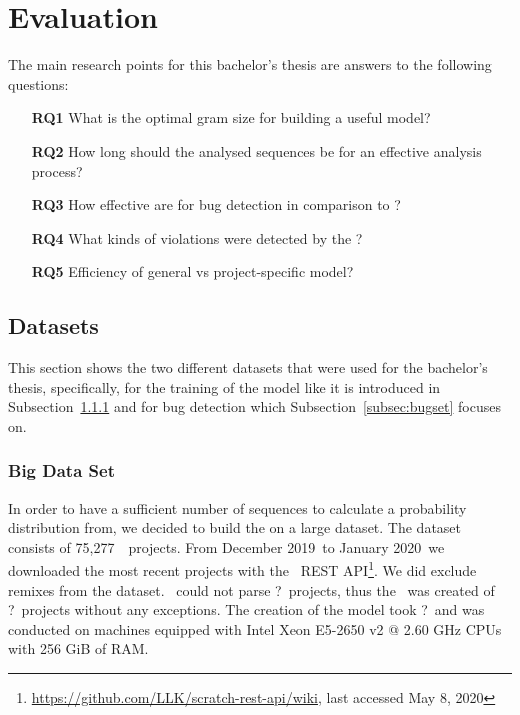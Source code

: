 
\newcommand{\numlarge}{75,277}
\newcommand{\monthstart}{December 2019}
\newcommand{\monthend}{January 2020}
\newcommand{\parsingexcp}{?}
\newcommand{\notfoundexcp}{?}
\newcommand{\successfullyanalysed}{?}
\newcommand{\creationtime}{?}

\chapter{Evaluation}\label{chap:evaluation}

The main research points for this bachelor's thesis are answers to the following questions:
\begin{itemize}
\item[\textbf{RQ1}] What is the optimal gram size for building a useful model?
\item[\textbf{RQ2}] How long should the analysed sequences be for an effective analysis process?
\item[\textbf{RQ3}] How effective are  for bug detection in comparison to \litterbox{}?
\item[\textbf{RQ4}] What kinds of violations were detected by the \ngram{}?
\item[\textbf{RQ5}] Efficiency of general \ngram{} vs project-specific model?
\end{itemize}


\section{Datasets}\label{sec:dataset}
This section shows the two different datasets that were used for the bachelor's thesis, specifically, for the training of the model like it is introduced in Subsection~\ref{subsec:trainingset} and for bug detection which Subsection~\ref{subsec:bugset} focuses on.

\subsection{Big Data Set}\label{subsec:trainingset}
In order to have a sufficient number of sequences to calculate a probability distribution from, we decided to build the \ngram{} on a large dataset. The dataset consists of \numlarge\ \scratch\ projects. From \monthstart\ to \monthend\ we downloaded the most recent projects with the \scratch\ REST API\footnote{\url{https://github.com/LLK/scratch-rest-api/wiki}, last accessed May 8, 2020}. We did exclude remixes from the dataset. \litterbox\ could not parse \parsingexcp\ projects, thus the \ngram\ was created of \successfullyanalysed\ projects without any exceptions. The creation of the model took \creationtime\ and was conducted on machines equipped with Intel Xeon E5-2650 v2 @ 2.60 GHz CPUs with 256 GiB of RAM.

